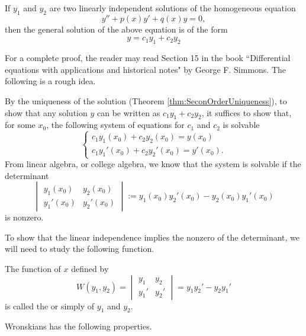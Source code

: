 \begin{theorem}\label{thm:generalsolutionlinearsecondorder}
If $y_1$ and $y_2$ are two linearly independent solutions of the homogeneous equation
\[y'' + p(x) y' + q(x) y = 0,\]
then the general solution of the above equation is of the form 
\[y=c_1 y_1 + c_2 y_2\]
\end{theorem}
For a complete proof, the reader may read Section 15 in the book ``Differential equations with applications and historical notes" by George F. Simmons. 
The following is a rough idea.

By the uniqueness of the solution (Theorem \ref{thm:SeconOrderUniqueness}), to show that any solution $y$ can be written as $c_1y_1+c_2y_2$, it suffices to show that, for some $x_0$, the following system of equations for $c_1$ and $c_2$ is solvable
  \[
    \begin{cases}
      c_{1} y_{1}(x_{0})+c_{2} y_{2}(x_{0})=y(x_{0})
      \\
      c_{1} y_{1}'(x_{0})+c_{2} y_{2}'(x_{0})=y'(x_{0}).
    \end{cases}
  \]
  From linear algebra, or college algebra, we know that the system is solvable if the determinant
  \begin{equation}
  \begin{vmatrix}
    y_{1}(x_{0}) & y_{2}(x_{0}) \\
  y_{1}'(x_{0}) & y_{2}'(x_{0})
  \end{vmatrix}
  :=y_{1}(x_{0}) y_{2}'(x_{0})-y_{2}(x_{0}) y_{1}'(x_{0}) \label{eq:5-1-1}
  \end{equation}
  is nonzero.

  To show that the linear independence implies the nonzero of the determinant, we will need to study the following function.

The function of $x$ defined by
\[W(y_1, y_2) = \begin{vmatrix}
  y_{1} & y_{2} \\
y_{1}' & y_{2}'
\end{vmatrix} = y_1y_2'- y_2y_1'\]
is called the  or simply  of $y_1$ and $y_2$.

Wronskians has the following properties.

